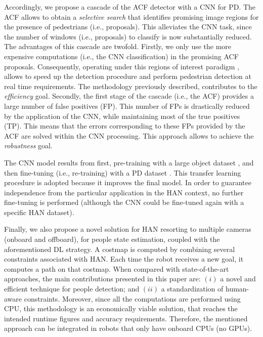 \documentclass[5p,time]{elsarticle}
\begin{document}
Accordingly, we propose a cascade of the ACF detector
\cite{DollarPAMI2014} with a CNN for PD. The ACF allows to obtain a
{\em selective search} that identifies promising image regions for
the presence of pedestrians (i.e., proposals). This alleviates the
CNN task, since the number of windows (i.e., proposals) to classify
is now substantially reduced. The advantages of this cascade are
twofold. Firstly, we only use the more expensive computations (i.e.,
the CNN classification) in the promising ACF proposals.
Consequently, operating under this regions of interest paradigm
\cite{Girshick2014,Hosang2015Cvpr}, allows to speed up the detection
procedure and perform pedestrian detection at real time
requirements. The methodology previously described, contributes to
the {\em efficiency} goal. Secondly, the first stage of the cascade
(i.e., the ACF) provides a large number of false positives (FP). This
number of FPs is drastically reduced by the application of the CNN,
while maintaining most of the true positives (TP). This means that
the errors corresponding to these FPs provided by the ACF are solved
within the CNN processing. This approach allows to achieve the {\em robustness}
goal.

The CNN model results from first, pre-training with a large object
dataset \cite{RussakovskyIJCV2015}, and then fine-tuning
(i.e., re-training) with a PD dataset \cite{DalalCVPR2005}. This transfer
learning procedure \cite{YosinskiNIPS2014} is adopted because it
improves the final model. In order to guarantee independence from the
particular application in the HAN context, no further fine-tuning is
performed (although the CNN could be fine-tuned again with a
specific HAN dataset).

Finally, we also propose a novel solution for HAN resorting to
multiple cameras (onboard and offboard), for people state
estimation, coupled with the aforementioned DL strategy. A costmap
is computed by combining several constraints associated with HAN.
Each time the robot receives a new goal, it computes a path on that
costmap.
When compared with state-of-the-art approaches, the main
contributions presented in this paper are: $(i)$ a novel and efficient
technique for people detection; and $(ii)$ a standardization of human-aware
constraints. Moreover, since all the computations are performed using CPU, this methodology is an economically
viable solution, that reaches the intended runtime figures and accuracy requirements. Therefore, the mentioned approach
can be integrated in robots that only have onboard CPUs (no GPUs).
\end{document}
